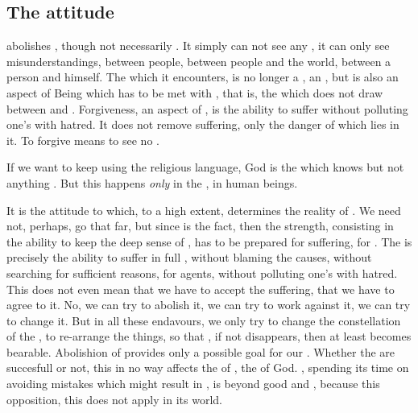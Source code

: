 {{\subsection{The attitude}

\pa {} abolishes , though not necessarily . 
It simply can not see any , it can only see 
misunderstandings, between people, between people and the world, 
between a person and himself.  The
 which it encounters, is no longer a , an
, but is also an aspect of Being which has
to be met with , that is, the  which 
does not draw  between  and .  Forgiveness, an aspect of , is the
ability to suffer without polluting one's  with hatred. 
It does not remove suffering, only the danger of  which
lies in it.  To forgive means to see no .

If we want to keep using the religious language, God is the 
 which knows  but not anything . 
But this  happens {\em only} in the , in 
human beings. 


\pa It is the attitude to  which, to a high extent,
determines the reality of .   We need not, perhaps, go that far, but
since  is the  fact, then the 
strength, consisting in the ability to keep the deep sense of
, has to be prepared for suffering, for .  The  is precisely the ability to
suffer in full , without blaming the 
causes, without searching for sufficient reasons, for 
agents, without polluting one's  with hatred.  This
 does not even mean that we have to accept the suffering,
that we have to agree to it.  No, we can try to abolish it, we can try
to work against it, we can try to change it.  But in all these
endavours, we only try to change the constellation of the , to re-arrange the  things, so that , if
not disappears, then at least becomes bearable.  Abolishion of
 provides only a possible  goal for our
.  Whether the  are succesfull or not, this in
no way affects the  of , the  of God. 
, spending its time on avoiding mistakes which 
might result in , is beyond good and , because this 
opposition, this  does not apply in its world. 

}}
